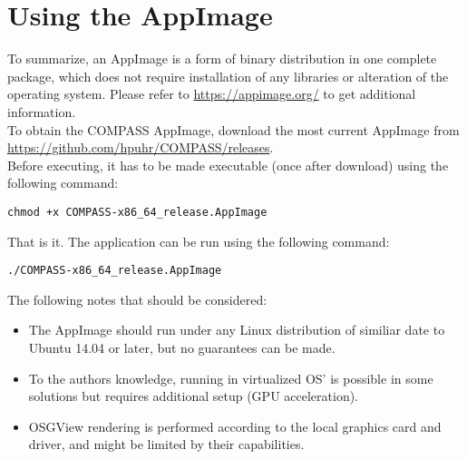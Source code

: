 \section{Using the AppImage}

To summarize, an AppImage is a form of binary distribution in one complete package, which does not require installation of any libraries or alteration of the operating system. Please refer to \url{https://appimage.org/} to get additional information. \\

To obtain the COMPASS AppImage, download the most current AppImage from \url{https://github.com/hpuhr/COMPASS/releases}. \\

Before executing, it has to be made executable (once after download) using the following command:
\begin{lstlisting}
chmod +x COMPASS-x86_64_release.AppImage
\end{lstlisting}

That is it. The application can be run using the following command:
\begin{lstlisting}
./COMPASS-x86_64_release.AppImage
\end{lstlisting}

The following notes that should be considered:

\begin{itemize}  
\item The AppImage should run under any Linux distribution of similiar date to Ubuntu 14.04 or later, but no guarantees can be made.
\item To the authors knowledge, running in virtualized OS' is possible in some solutions but requires additional setup (GPU acceleration).
\item OSGView rendering is performed according to the local graphics card and driver, and might be limited by their capabilities.
\end{itemize} 
